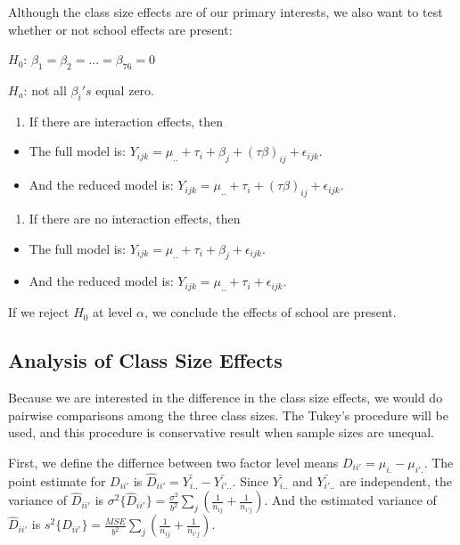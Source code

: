 \documentclass[]{article}
\providecommand{\tightlist}{%
  \setlength{\itemsep}{0pt}\setlength{\parskip}{0pt}}
\begin{document}
Although the class size effects are of our primary interests, we also want to test whether or not school effects are present:

\(H_0\): \(\beta_1 = \beta_2 =...= \beta_{76} = 0\)

\(H_a\): not all \(\beta_i's\) equal zero.

\begin{enumerate}
\def\labelenumi{(\arabic{enumi})}
\tightlist
\item
  If there are interaction effects, then
\end{enumerate}

\begin{itemize}
\item
  The full model is: \(Y_{ijk} = \mu_{..} + \tau_i + \beta_j + (\tau\beta)_{ij} +\epsilon_{ijk}\).
\item
  And the reduced model is: \(Y_{ijk} = \mu_{..} + \tau_i + (\tau\beta)_{ij} +\epsilon_{ijk}\).
\end{itemize}

\begin{enumerate}
\def\labelenumi{(\arabic{enumi})}
\setcounter{enumi}{1}
\tightlist
\item
  If there are no interaction effects, then
\end{enumerate}

\begin{itemize}
\item
  The full model is: \(Y_{ijk} = \mu_{..} + \tau_i + \beta_j + \epsilon_{ijk}\).
\item
  And the reduced model is: \(Y_{ijk} = \mu_{..} + \tau_i + \epsilon_{ijk}\).
\end{itemize}

If we reject \(H_0\) at level \(\alpha\), we conclude the effects of school are present.

\hypertarget{analysis-of-class-size-effects}{%
\subsection{Analysis of Class Size Effects}\label{analysis-of-class-size-effects}}

Because we are interested in the difference in the class size effects, we would do pairwise comparisons among the three class sizes. The Tukey's procedure will be used, and this procedure is conservative result when sample sizes are unequal.

First, we define the differnce between two factor level means \(D_{ii'} = \mu_{i.} - \mu_{i'.}\). The point estimate for \(D_{ii'}\) is \(\hat D_{ii'} = \bar{Y_{i..}}-\bar{Y_{i'..}}\). Since \(\bar {Y_{i..}}\) and \(\bar {Y_{i'..}}\) are independent, the variance of \(\hat D_{ii'}\) is \(\sigma^2\{\hat D_{ii'}\}=\frac{\sigma^2}{b^2}\sum_j(\frac{1}{n_{ij}}+\frac{1}{n_{i'j}})\). And the estimated variance of \(\hat D_{ii'}\) is \(s^2\{\hat D_{ii'}\}=\frac{MSE}{b^2}\sum_j(\frac{1}{n_{ij}}+\frac{1}{n_{i'j}})\).
\end{document}

